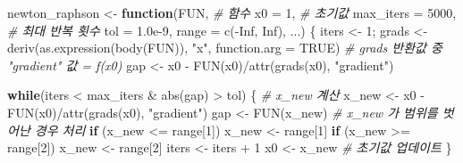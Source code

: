 \documentclass[
  11pt,
]{krantz}
\newenvironment{Shaded}{\begin{snugshade}}{\end{snugshade}}
\newcommand{\AttributeTok}[1]{\textcolor[rgb]{0.61,0.61,0.61}{#1}}
\newcommand{\CommentTok}[1]{\textcolor[rgb]{0.37,0.37,0.37}{\textit{#1}}}
\newcommand{\ConstantTok}[1]{\textcolor[rgb]{0,0,0}{#1}}
\newcommand{\ControlFlowTok}[1]{\textcolor[rgb]{0.27,0.27,0.27}{\textbf{#1}}}
\newcommand{\DecValTok}[1]{\textcolor[rgb]{0.06,0.06,0.06}{#1}}
\newcommand{\FloatTok}[1]{\textcolor[rgb]{0.06,0.06,0.06}{#1}}
\newcommand{\FunctionTok}[1]{\textcolor[rgb]{0,0,0}{#1}}
\newcommand{\NormalTok}[1]{#1}
\newcommand{\OtherTok}[1]{\textcolor[rgb]{0.37,0.37,0.37}{#1}}
\newcommand{\SpecialCharTok}[1]{\textcolor[rgb]{0,0,0}{#1}}
\newcommand{\StringTok}[1]{\textcolor[rgb]{0.5,0.5,0.5}{#1}}
\begin{document}
\begin{Shaded}
\begin{Highlighting}[]
\NormalTok{newton\_raphson }\OtherTok{\textless{}{-}} \ControlFlowTok{function}\NormalTok{(FUN, }\CommentTok{\# 함수}
                           \AttributeTok{x0 =} \DecValTok{1}\NormalTok{, }\CommentTok{\# 초기값}
                           \AttributeTok{max\_iters =} \DecValTok{5000}\NormalTok{, }\CommentTok{\# 최대 반복 횟수}
                           \AttributeTok{tol =} \FloatTok{1.0e{-}9}\NormalTok{, }
                           \AttributeTok{range =} \FunctionTok{c}\NormalTok{(}\SpecialCharTok{{-}}\ConstantTok{Inf}\NormalTok{, }\ConstantTok{Inf}\NormalTok{), }
\NormalTok{                           ...) }
\NormalTok{\{}
\NormalTok{ iters }\OtherTok{\textless{}{-}} \DecValTok{1}\NormalTok{;}
\NormalTok{ grads }\OtherTok{\textless{}{-}} \FunctionTok{deriv}\NormalTok{(}\FunctionTok{as.expression}\NormalTok{(}\FunctionTok{body}\NormalTok{(FUN)), }\StringTok{"x"}\NormalTok{, }\AttributeTok{function.arg =} \ConstantTok{TRUE}\NormalTok{)}
 \CommentTok{\# grads 반환값 중 "gradient" 값 = f\textquotesingle{}(x0)}
\NormalTok{ gap }\OtherTok{\textless{}{-}}\NormalTok{ x0 }\SpecialCharTok{{-}} \FunctionTok{FUN}\NormalTok{(x0)}\SpecialCharTok{/}\FunctionTok{attr}\NormalTok{(}\FunctionTok{grads}\NormalTok{(x0), }\StringTok{"gradient"}\NormalTok{) }
 
 \ControlFlowTok{while}\NormalTok{(iters }\SpecialCharTok{\textless{}}\NormalTok{ max\_iters }\SpecialCharTok{\&} \FunctionTok{abs}\NormalTok{(gap) }\SpecialCharTok{\textgreater{}}\NormalTok{ tol) \{}
   \CommentTok{\# x\_new 계산 }
\NormalTok{   x\_new }\OtherTok{\textless{}{-}}\NormalTok{ x0 }\SpecialCharTok{{-}} \FunctionTok{FUN}\NormalTok{(x0)}\SpecialCharTok{/}\FunctionTok{attr}\NormalTok{(}\FunctionTok{grads}\NormalTok{(x0), }\StringTok{"gradient"}\NormalTok{)}
\NormalTok{   gap }\OtherTok{\textless{}{-}} \FunctionTok{FUN}\NormalTok{(x\_new) }
   \CommentTok{\# x\_new 가 범위를 벗어난 경우 처리}
   \ControlFlowTok{if}\NormalTok{ (x\_new }\SpecialCharTok{\textless{}=}\NormalTok{ range[}\DecValTok{1}\NormalTok{]) x\_new }\OtherTok{\textless{}{-}}\NormalTok{ range[}\DecValTok{1}\NormalTok{] }
   \ControlFlowTok{if}\NormalTok{ (x\_new }\SpecialCharTok{\textgreater{}=}\NormalTok{ range[}\DecValTok{2}\NormalTok{]) x\_new }\OtherTok{\textless{}{-}}\NormalTok{ range[}\DecValTok{2}\NormalTok{]}
\NormalTok{   iters }\OtherTok{\textless{}{-}}\NormalTok{ iters }\SpecialCharTok{+} \DecValTok{1}
\NormalTok{   x0 }\OtherTok{\textless{}{-}}\NormalTok{ x\_new }\CommentTok{\# 초기값 업데이트}
\NormalTok{ \}}
 

\end{Highlighting}
\end{Shaded}
\end{document}
